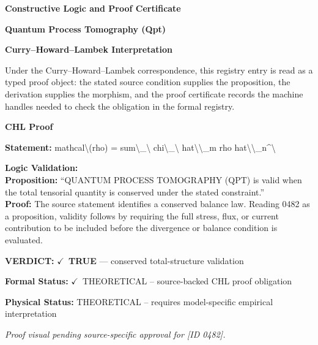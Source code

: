 \clearpage
\begingroup\tzpsupportsetup
\noindent\textbf{\fontsize{10.8pt}{12.8pt}\selectfont [ID 0482] Constructive Logic and Proof Certificate}\par
\noindent\textbf{\fontsize{10pt}{12pt}\selectfont Quantum Process Tomography (Qpt)}\par
\vspace{0.45em}
\begingroup
\footnotesize
\setlength{\parskip}{0.22em}
\setlength{\parindent}{0pt}
\noindent\textbf{Curry--Howard--Lambek Interpretation}\par
Under the Curry--Howard--Lambek correspondence, this registry entry is read as a typed proof
object: the stated source condition supplies the proposition, the derivation supplies the
morphism, and the proof certificate records the machine handles needed to check the obligation
in the formal registry.

\vspace{0.45em}
\noindent\textbf{CHL Proof}\par
\textbf{Statement:} mathcal\textbackslash{}(rho) = sum\textbackslash{}\_\textbackslash{} chi\textbackslash{}\_\textbackslash{} hat\textbackslash{}\textbackslash{}\_m rho hat\textbackslash{}\textbackslash{}\_n\textasciicircum{}\textbackslash{}

\textbf{Logic Validation:}\\
\textbf{Proposition:} ``QUANTUM PROCESS TOMOGRAPHY (QPT) is valid when the total tensorial quantity is conserved
under the stated constraint.''\\
\textbf{Proof:} The source statement identifies a conserved balance law. Reading 0482 as a proposition,
validity follows by requiring the full stress, flux, or current contribution to be
included before the divergence or balance condition is evaluated.

\textbf{VERDICT:} \ensuremath{\checkmark}\ \textbf{TRUE} --- conserved total-structure validation

\textbf{Formal Status:} \ensuremath{\checkmark}\ THEORETICAL -- source-backed CHL proof obligation

\textbf{Physical Status:} THEORETICAL -- requires model-specific empirical interpretation
\par\vspace{0.45em}
\par
\vfill
\begingroup\footnotesize\itshape
Proof visual pending source-specific approval for [ID 0482].
\par\endgroup
\vfill
\endgroup
\endgroup
